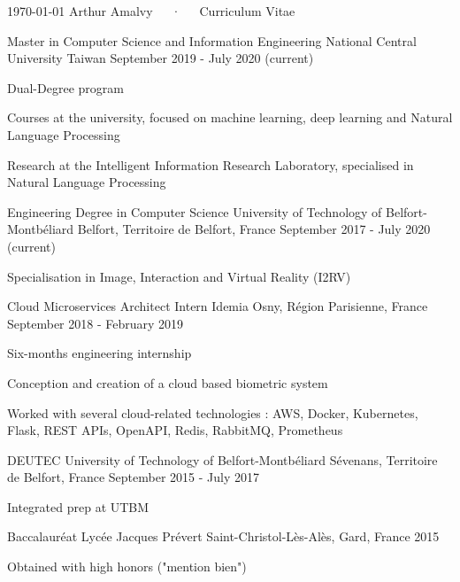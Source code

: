 \documentclass[11pt, a4paper]{awesome-cv}
\begin{document}
\makecvheader

\makecvfooter
  {\today}
  {Arthur Amalvy~~~·~~~Curriculum Vitae}
  {\thepage}



\begin{cventries}

  \cventry
  {Master in Computer Science and Information Engineering} %
  {National Central University} %
  {Taiwan} %
  {September 2019 - July 2020 (current)} %
  {
    \begin{cvitems} %
      \item Dual-Degree program
      \item Courses at the university, focused on machine learning, deep learning and Natural Language Processing
      \item Research at the Intelligent Information Research Laboratory, specialised in Natural Language Processing
    \end{cvitems}
  }

  \cventry
  {Engineering Degree in Computer Science}
  {University of Technology of Belfort-Montbéliard}
  {Belfort, Territoire de Belfort, France}
  {September 2017 - July 2020 (current)}
  {
    \begin{cvitems}
      \item Specialisation in Image, Interaction and Virtual Reality (I2RV)
    \end{cvitems}
  }

  \cventry
  {Cloud Microservices Architect Intern}
  {Idemia}
  {Osny, Région Parisienne, France}
  {September 2018 - February 2019}
  {
    \begin{cvitems}
      \item Six-months engineering internship 
      \item Conception and creation of a cloud based biometric system
      \item Worked with several cloud-related technologies : AWS, Docker, Kubernetes, Flask, REST APIs, OpenAPI, Redis, RabbitMQ, Prometheus
    \end{cvitems}
  }

  \cventry
  {DEUTEC}
  {University of Technology of Belfort-Montbéliard}
  {Sévenans, Territoire de Belfort, France}
  {September 2015 - July 2017}
  {
    \begin{cvitems}
      \item Integrated prep at UTBM
    \end{cvitems}
  }

  \cventry
  {Baccalauréat}
  {Lycée Jacques Prévert}
  {Saint-Christol-Lès-Alès, Gard, France}
  {2015}
  {
    \begin{cvitems}
      \item Obtained with high honors ("mention bien")
    \end{cvitems}
  }

\end{cventries}
\end{document}
